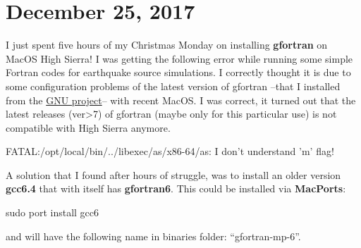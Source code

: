 \documentclass[12pt]{article}
\newenvironment{ppl}{\ttfamily}{\par}
\begin{document}


\section*{\large December 25, 2017}
\vspace{-0.1 in}

I just spent five hours of my Christmas Monday on installing {\bf gfortran} on MacOS High Sierra! I was getting the following error while running some simple Fortran codes for earthquake source simulations. I correctly thought it is due to some configuration problems of the latest version of gfortran --that I installed from the \href{https://gcc.gnu.org/wiki/GFortranBinariesMacOS}{GNU project}-- with recent MacOS. I was correct, it turned out that the latest releases (ver>7) of gfortran (maybe only for this particular use) is not compatible with High Sierra anymore. 

\begin{ppl}
FATAL:/opt/local/bin/../libexec/as/x86-64/as: I don't understand 'm' flag! 
\end{ppl}

A solution that I found after hours of struggle, was to install an older version {\bf gcc6.4} that with itself has {\bf gfortran6}. This could be installed via {\bf MacPorts}:

\begin{ppl}
sudo port install gcc6
\end{ppl}

and will have the following name in binaries folder: ``gfortran-mp-6''.


%




%
%
\end{document}
